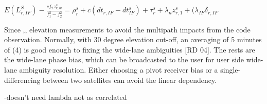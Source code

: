 $
E(L_{r,IF}^S) - \frac{cf_2z_{r,w}^s}{f_1^2 - f_2^2} = \rho_r^s + c(dt_{r,IF} - dt_{IF}^s) + \tau_r^s + \lambda_n z_{r,1}^s + (\lambda_{IF}\delta_{r,IF}$

Since ,,%
elevation measurements to avoid the multipath impacts from the code observation. Normally, with
30 degree elevation cut-off, an averaging of 5 minutes of (4) is good enough to fixing the wide-lane
ambiguities [RD 04]. The rests are the wide-lane phase bias, which can be broadcasted to the user for
user side wide-lane ambiguity resolution. Either choosing a pivot receiver bias or a single-differencing
between two satellites can avoid the linear dependency. 


-doesn't need lambda not as correlated